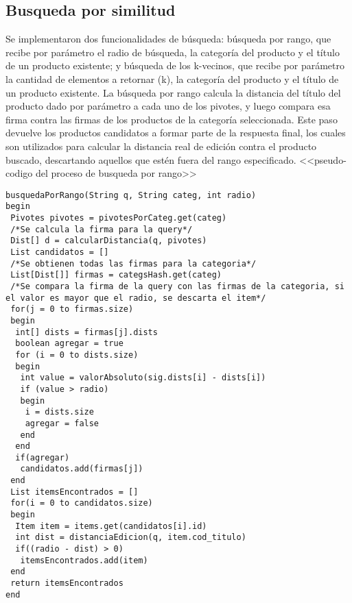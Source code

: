 \subsection{Busqueda por similitud}
Se implementaron dos funcionalidades de b\'usqueda: b\'usqueda por rango, que 
recibe por par\'ametro el radio de b\'usqueda, la categor\'ia del producto y el
 t\'itulo de un producto existente; y b\'usqueda de los k-vecinos, que recibe 
 por par\'ametro la cantidad de elementos a retornar (k), la categor\'ia del 
 producto y el t\'itulo de un producto existente.
La b\'usqueda por rango calcula la distancia del t\'itulo del producto dado por
 par\'ametro a cada uno de los pivotes, y luego compara esa firma contra las 
firmas de los productos de la categor\'ia seleccionada. Este paso devuelve los 
productos candidatos a formar parte de la respuesta final, los cuales son 
utilizados para calcular la distancia real de edici\'on contra el producto 
buscado, descartando aquellos que est\'en fuera del rango especificado.
<<pseudo-codigo del proceso de busqueda por rango>>
\begin{lstlisting}
busquedaPorRango(String q, String categ, int radio)
begin
 Pivotes pivotes = pivotesPorCateg.get(categ)
 /*Se calcula la firma para la query*/
 Dist[] d = calcularDistancia(q, pivotes)
 List candidatos = []
 /*Se obtienen todas las firmas para la categoria*/
 List[Dist[]] firmas = categsHash.get(categ)
 /*Se compara la firma de la query con las firmas de la categoria, si el valor es mayor que el radio, se descarta el item*/
 for(j = 0 to firmas.size)
 begin
  int[] dists = firmas[j].dists
  boolean agregar = true
  for (i = 0 to dists.size)
  begin
   int value = valorAbsoluto(sig.dists[i] - dists[i])
   if (value > radio)
   begin
    i = dists.size
    agregar = false
   end
  end
  if(agregar)
   candidatos.add(firmas[j])
 end
 List itemsEncontrados = []
 for(i = 0 to candidatos.size)
 begin
  Item item = items.get(candidatos[i].id)
  int dist = distanciaEdicion(q, item.cod_titulo)
  if((radio - dist) > 0)
   itemsEncontrados.add(item)
 end
 return itemsEncontrados
end
\end{lstlisting}

